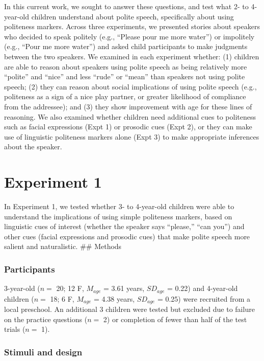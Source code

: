\documentclass[10pt, letterpaper]{article}
\begin{document}
In this current work, we sought to answer these questions, and test what
2- to 4-year-old children understand about polite speech, specifically
about using politeness markers. Across three experiments, we presented
stories about speakers who decided to speak politely (e.g., ``Please
pour me more water'') or impolitely (e.g., ``Pour me more water'') and
asked child participants to make judgments between the two speakers. We
examined in each experiment whether: (1) children are able to reason
about speakers using polite speech as being relatively more ``polite''
and ``nice'' and less ``rude'' or ``mean'' than speakers not using
polite speech; (2) they can reason about social implications of using
polite speech (e.g., politeness as a sign of a nice play partner, or
greater likelihood of compliance from the addressee); and (3) they show
improvement with age for these lines of reasoning. We also examined
whether children need additional cues to politeness such as facial
expressions (Expt 1) or prosodic cues (Expt 2), or they can make use of
linguistic politeness markers alone (Expt 3) to make appropriate
inferences about the speaker.

\section{Experiment 1}\label{experiment-1}

In Experiment 1, we tested whether 3- to 4-year-old children were able
to understand the implications of using simple politeness markers, based
on linguistic cues of interest (whether the speaker says ``please,''
``can you'') and other cues (facial expressions and prosodic cues) that
make polite speech more salient and naturalistic. \#\# Methods

\subsubsection{Participants}\label{participants}

3-year-old (\(n=\) 20; 12 F, \(M_{age}\) = 3.61 years, \(SD_{age}\) =
0.22) and 4-year-old children (\(n=\) 18; 6 F, \(M_{age}\) = 4.38 years,
\(SD_{age}\) = 0.25) were recruited from a local preschool. An
additional 3 children were tested but excluded due to failure on the
practice questions (\(n=\) 2) or completion of fewer than half of the
test trials (\(n=\) 1).

\subsubsection{Stimuli and design}\label{stimuli-and-design}
\end{document}
